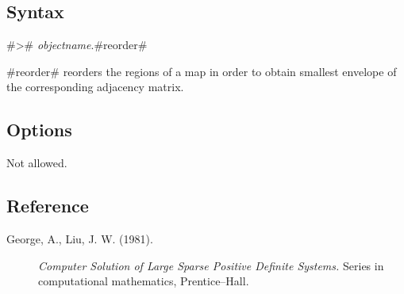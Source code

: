 \subsection*{Syntax}

#># {\em objectname}.#reorder#

#reorder# reorders the regions of a map in order to obtain
smallest envelope of the corresponding adjacency matrix.

\subsection*{Options}

Not allowed.

\subsection*{Reference}

\begin{description}

\item[George, A., Liu, J. W. (1981).] {\em Computer Solution of Large
Sparse Positive Definite Systems.} Series in computational
mathematics, Prentice--Hall.

\end{description}
